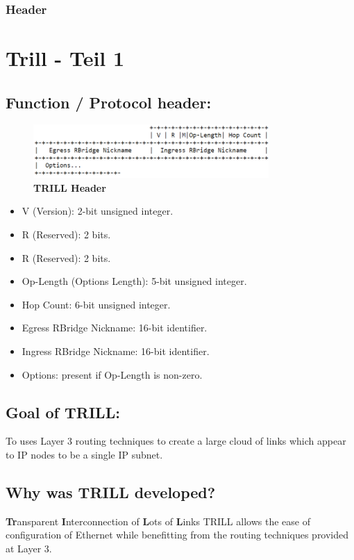 \documentclass[a4,12pt]{scrartcl}
\begin{document}
\subsubsection{Header}
\section{Trill - Teil 1}
\subsection{Function / Protocol header:} 
\begin{figure} [H]
	\begin{center}
	\includegraphics[width=0.80\textwidth]{./pictures/trill_header.png}
	\caption{\textbf{TRILL Header}}
	\label{x}
	\end{center}
\end{figure}
\begin{itemize}
\item V (Version): 2-bit unsigned integer.
\item R (Reserved): 2 bits.
\item R (Reserved): 2 bits.
\item Op-Length (Options Length): 5-bit unsigned integer.
\item Hop Count: 6-bit unsigned integer.
\item Egress RBridge Nickname: 16-bit identifier.
\item Ingress RBridge Nickname: 16-bit identifier.
\item Options: present if Op-Length is non-zero.
\end{itemize}

\subsection{Goal of TRILL:}
To uses Layer 3 routing techniques to create a large cloud of links which appear to IP nodes to be a single IP subnet. 

\subsection{Why was TRILL developed?}
\textbf{Tr}ansparent \textbf{I}nterconnection of \textbf{L}ots of \textbf{L}inks TRILL allows the ease of configuration of Ethernet while benefitting from the routing techniques provided at Layer 3.
\end{document}
